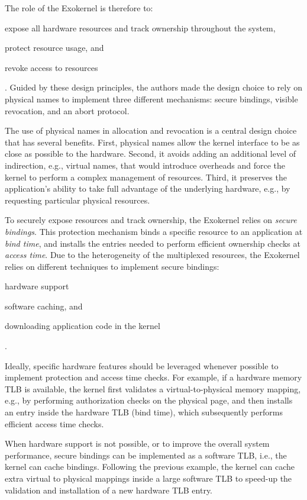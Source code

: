 The role of the Exokernel is therefore to:
\begin{enumerate*}
	\item \label{expose} expose all hardware resources and track ownership throughout the system,
	\item \label{protect} protect resource usage, and
	\item \label{revoke} revoke access to resources
\end{enumerate*}.
Guided by these design principles, the authors made the design choice to rely on physical names to implement three different mechanisms: secure bindings, visible revocation, and an abort protocol.

The use of physical names in allocation and revocation is a central design choice that has several benefits.
First, physical names allow the kernel interface to be as close as possible to the hardware.
Second, it avoids adding an additional level of indirection, e.g., virtual names, that would introduce overheads and force the kernel to perform a complex management of resources.
Third, it preserves the application's ability to take full advantage of the underlying hardware, e.g., by requesting particular physical resources.

To securely expose resources and track ownership, the Exokernel relies on \emph{secure bindings}.
This protection mechanism binds a specific resource to an application at \emph{bind time}, and installs the entries needed to perform efficient ownership checks at \emph{access time}.
Due to the heterogeneity of the multiplexed resources, the Exokernel relies on different techniques to implement secure bindings:
\begin{enumerate*}
	\item hardware support
	\item software caching, and
	\item downloading application code in the kernel
\end{enumerate*}.

Ideally, specific hardware features should be leveraged whenever possible to implement protection and access time checks.
For example, if a hardware memory TLB is available, the kernel first validates a virtual-to-physical memory mapping, e.g., by performing authorization checks on the physical page, and then installs an entry inside the hardware TLB (bind time), which subsequently performs efficient access time checks.

When hardware support is not possible, or to improve the overall system performance, secure bindings can be implemented as a software TLB, i.e., the kernel can cache bindings.
Following the previous example, the kernel can cache extra virtual to physical mappings inside a large software TLB to speed-up the validation and installation of a new hardware TLB entry.

